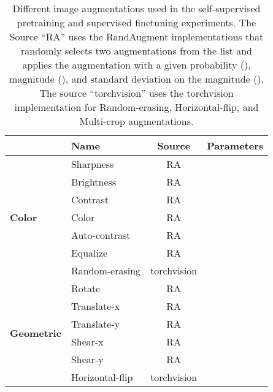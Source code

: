 \documentclass[times,twocolumn,final]{elsarticle}
\begin{document}
\begin{table}[ht!]
  \centering
  \small
  \caption{Different image augmentations used in the self-supervised pretraining and supervised finetuning experiments. The Source ``RA'' uses the RandAugment \citep{cubuk2020randaugment} implementations that randomly selects two augmentations from the list and applies the augmentation with a given probability (), magnitude (), and standard deviation on the magnitude (). The source ``torchvision'' uses the torchvision implementation for Random-erasing, Horizontal-flip, and Multi-crop augmentations.}
  \label{tab:augs:details}
  \begin{tabular}{llcc}\toprule
                                           & \textbf{Name}     & \textbf{Source} & \textbf{Parameters}                          \\ \midrule
    \multirow{7}{*}{\textbf{Color}}        & Sharpness         & RA              &               \\
                                           & Brightness        & RA              &               \\
                                           & Contrast          & RA              &               \\
                                           & Color             & RA              &               \\
                                           & Auto-contrast     & RA              &               \\
                                           & Equalize          & RA              &               \\
                                           & Random-erasing    & torchvision     &                 \\\midrule
    \multirow{6}{*}{\textbf{Geometric}}    & Rotate            & RA              &               \\
                                           & Translate-x       & RA              &               \\
                                           & Translate-y       & RA              &               \\
                                           & Shear-x           & RA              &               \\
                                           & Shear-y           & RA              &               \\
                                           & Horizontal-flip   & torchvision     &                                    \\\midrule

\end{tabular}
\end{table}
\end{document}

